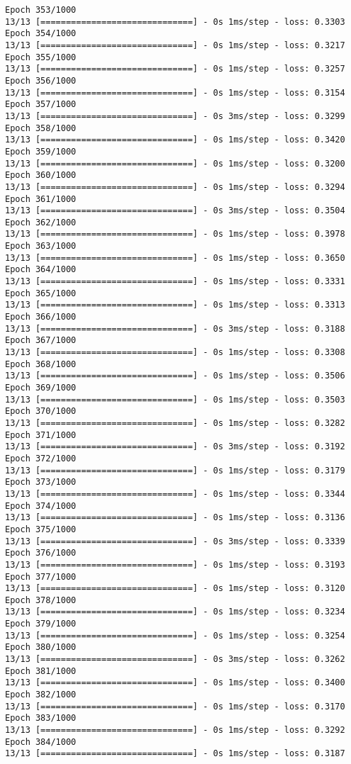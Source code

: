\documentclass[11pt]{article}
\begin{document}
\begin{Verbatim}[commandchars=\\\{\}]
Epoch 353/1000
13/13 [==============================] - 0s 1ms/step - loss: 0.3303
Epoch 354/1000
13/13 [==============================] - 0s 1ms/step - loss: 0.3217
Epoch 355/1000
13/13 [==============================] - 0s 1ms/step - loss: 0.3257
Epoch 356/1000
13/13 [==============================] - 0s 1ms/step - loss: 0.3154
Epoch 357/1000
13/13 [==============================] - 0s 3ms/step - loss: 0.3299
Epoch 358/1000
13/13 [==============================] - 0s 1ms/step - loss: 0.3420
Epoch 359/1000
13/13 [==============================] - 0s 1ms/step - loss: 0.3200
Epoch 360/1000
13/13 [==============================] - 0s 1ms/step - loss: 0.3294
Epoch 361/1000
13/13 [==============================] - 0s 3ms/step - loss: 0.3504
Epoch 362/1000
13/13 [==============================] - 0s 1ms/step - loss: 0.3978
Epoch 363/1000
13/13 [==============================] - 0s 1ms/step - loss: 0.3650
Epoch 364/1000
13/13 [==============================] - 0s 1ms/step - loss: 0.3331
Epoch 365/1000
13/13 [==============================] - 0s 1ms/step - loss: 0.3313
Epoch 366/1000
13/13 [==============================] - 0s 3ms/step - loss: 0.3188
Epoch 367/1000
13/13 [==============================] - 0s 1ms/step - loss: 0.3308
Epoch 368/1000
13/13 [==============================] - 0s 1ms/step - loss: 0.3506
Epoch 369/1000
13/13 [==============================] - 0s 1ms/step - loss: 0.3503
Epoch 370/1000
13/13 [==============================] - 0s 1ms/step - loss: 0.3282
Epoch 371/1000
13/13 [==============================] - 0s 3ms/step - loss: 0.3192
Epoch 372/1000
13/13 [==============================] - 0s 1ms/step - loss: 0.3179
Epoch 373/1000
13/13 [==============================] - 0s 1ms/step - loss: 0.3344
Epoch 374/1000
13/13 [==============================] - 0s 1ms/step - loss: 0.3136
Epoch 375/1000
13/13 [==============================] - 0s 3ms/step - loss: 0.3339
Epoch 376/1000
13/13 [==============================] - 0s 1ms/step - loss: 0.3193
Epoch 377/1000
13/13 [==============================] - 0s 1ms/step - loss: 0.3120
Epoch 378/1000
13/13 [==============================] - 0s 1ms/step - loss: 0.3234
Epoch 379/1000
13/13 [==============================] - 0s 1ms/step - loss: 0.3254
Epoch 380/1000
13/13 [==============================] - 0s 3ms/step - loss: 0.3262
Epoch 381/1000
13/13 [==============================] - 0s 1ms/step - loss: 0.3400
Epoch 382/1000
13/13 [==============================] - 0s 1ms/step - loss: 0.3170
Epoch 383/1000
13/13 [==============================] - 0s 1ms/step - loss: 0.3292
Epoch 384/1000
13/13 [==============================] - 0s 1ms/step - loss: 0.3187

\end{Verbatim}
\end{document}
